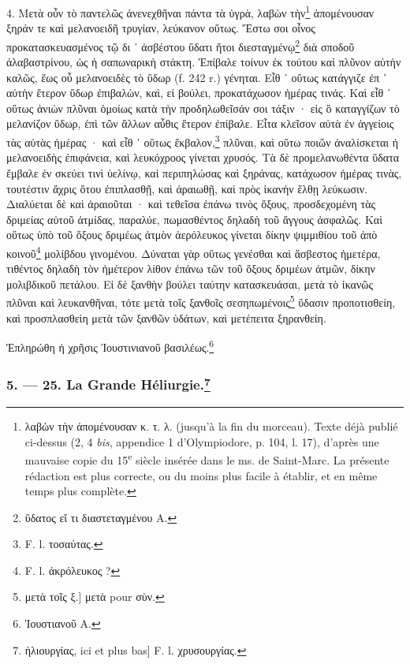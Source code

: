 \documentclass[a4paper, 11pt, oneside, polutonikogreek, french]{article}
\begin{document}
4. Μετὰ οὖν τὸ παντελῶς ἀνενεχθῆναι πάντα τὰ ὑγρὰ, λαβὼν τὴν\footnote{λαβὼν τὴν ἀπομένουσαν κ. τ. λ. (jusqu'à la fin du morceau). Texte déjà publié ci-dessus (2, 4 \emph{bis}, appendice 1 d'Olympiodore, p. 104, l. 17), d'après une mauvaise copie du 15\textsuperscript{e} siècle insérée dans le ms. de Saint-Marc. La présente rédaction est plus correcte, ou du moins plus facile à établir, et en même temps plus complète.} ἀπομένουσαν ξηράν τε καὶ μελανοειδῆ τρυγίαν, λεύκανον οὕτως. Ἔστω σοι οἶνος προκατασκευασμένος τῷ δι ᾽ ἀσβέστου ὕδατι ἤτοι διεσταγμένῳ\footnote{ὕδατος εἴ τι διαστεταγμένου A.} διὰ σποδοῦ ἀλαβαστρίνου, ὡς ἡ σαπωναρικὴ στάκτη. Ἐπίβαλε τοίνυν ἐκ τούτου καὶ πλῦνον αὐτὴν καλῶς, ἕως οὗ μελανοειδὲς τὸ ὕδωρ (f. 242 r.) γένηται. Εἶθ ᾽ οὕτως κατάγγιζε ἐπ ᾽ αὐτὴν ἕτερον ὕδωρ ἐπιβαλὼν, καὶ, εἰ βούλει, προκατάχωσον ἡμέρας τινάς. Καὶ εἶθ ᾽ οὕτως ἀνιὼν πλῦναι ὁμοίως κατὰ τὴν προδηλωθεῖσάν σοι τάξιν · εἰς ὃ καταγγίζων τὸ μελανίζον ὕδωρ, ἐπὶ τῶν ἄλλων αὖθις ἕτερον ἐπίβαλε. Εἶτα κλεῖσον αὐτὰ ἐν ἀγγείοις τὰς αὐτὰς ἡμέρας · καὶ εἶθ ᾽ οὕτως ἔκβαλον,\footnote{F. l. τοσαύτας.} πλῦναι, καὶ οὕτω ποιῶν ἀναλίσκεται ἡ μελανοειδὴς ἐπιφάνεια, καὶ λευκόχροος γίνεται χρυσός. Τὰ δὲ προμελανωθέντα ὕδατα ἔμβαλε ἐν σκεύει τινὶ ὑελίνῳ, καὶ περιπηλώσας καὶ ξηράνας, κατάχωσον ἡμέρας τινὰς, τουτέστιν ἄχρις ὅτου ἐπιπλασθῇ, καὶ ἀραιωθῇ, καὶ πρὸς ἱκανὴν ἔλθῃ λεύκωσιν. Διαλύεται δὲ καὶ ἀραιοῦται · καὶ τεθεῖσα ἐπάνω τινὸς ὄξους, προσδεχομένη τὰς δριμείας αὐτοῦ ἀτμίδας, παραλύε, πωμασθέντος δηλαδὴ τοῦ ἄγγους ἀσφαλῶς. Καὶ οὕτως ὑπὸ τοῦ ὄξους δριμέως ἀτμὸν ἀερόλευκος γίνεται δίκην ψιμμιθίου τοῦ ἀπὸ κοινοῦ\footnote{F. l. ἀκρόλευκος ?} μολίβδου γινομένου. Δύναται γὰρ οὕτως γενέσθαι καὶ ἄσβεστος ἡμετέρα, τιθέντος δηλαδὴ τὸν ἡμέτερον λίθον ἐπάνω τῶν τοῦ ὄξους δριμέων ἀτμῶν, δίκην μολιβδικοῦ πετάλου. Εἰ δὲ ξανθὴν βούλει ταύτην κατασκευάσαι, μετὰ τὸ ἱκανῶς πλῦναι καὶ λευκανθῆναι, τότε μετὰ τοῖς ξανθοῖς σεσηπωμένοις\footnote{μετὰ τοῖς ξ.] μετὰ pour σὺν.} ὕδασιν προποτισθείη, καὶ προσπλασθείη μετὰ τῶν ξανθῶν ὑδάτων, καὶ μετέπειτα ξηρανθείη.

Ἑπληρώθη ἡ χρῆσις Ἰουστινιανοῦ βασιλέως.\footnote{Ἰουστιανοῦ A.}

\bigskip
\centerline{\EightStarTaper}
\centerline{\EightStarTaper\EightStarTaper}
\bigskip

\subsubsection[5. --- 25. La Grande Héliurgie.]{5. --- 25. La Grande Héliurgie.\footnote{ἡλιουργίας, ici et plus bas] F. l. χρυσουργίας.}}
\end{document}
